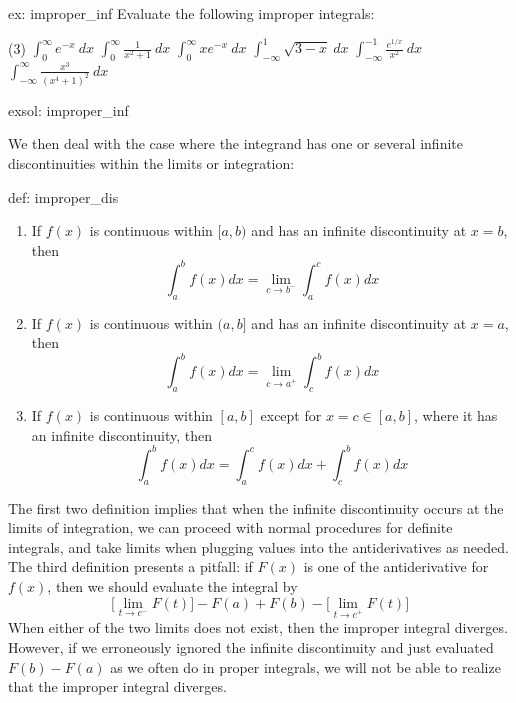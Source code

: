 \begin{ex}[]{ex: improper_inf}
    Evaluate the following improper integrals:
    \begin{tasks}(3)
        \task $\int_0^\infty e^{-x}~dx$
        \task $\int_0^\infty \frac{1}{x^2+1}~dx$
        \task $\int_0^\infty xe^{-x}~dx$
        \task $\int_{-\infty}^1 \sqrt{3-x}~dx$
        \task $\int_{-\infty}^{-1} \frac{e^{1/x}}{x^2}~dx$
        \task $\int_{-\infty}^{\infty} \frac{x^3}{(x^4+1)^2}~dx$
    \end{tasks}
\end{ex}

\begin{exsol}[]{exsol: improper_inf}
    \lipsum[2-4]
    \lipsum[2-4]
    \lipsum[2-3]
\end{exsol}

We then deal with the case where the integrand has one or several infinite discontinuities within the limits or integration:

\begin{defi}{def: improper_dis}
    \begin{enumerate}
        \item If $f(x)$ is continuous within $[a, b)$ and has an infinite discontinuity at $x = b$, then
        \[\int_a^b f(x)dx = \lim_{c \rightarrow b^-} \int_a^c f(x)dx\]
        \item If $f(x)$ is continuous within $(a, b]$ and has an infinite discontinuity at $x = a$, then
        \[\int_a^b f(x)dx = \lim_{c \rightarrow a^+} \int_c^b f(x)dx\]
        \item If $f(x)$ is continuous within $[a, b]$ except for $x = c \in [a, b]$, where it has an infinite discontinuity, then
        \[\int_a^b f(x)dx = \int_a^c f(x)dx + \int_c^b f(x)dx\]
    \end{enumerate}
\end{defi}

The first two definition implies that when the infinite discontinuity occurs at the limits of integration, we can proceed with normal procedures for definite integrals, and take limits when plugging values into the antiderivatives as needed.  The third definition presents a pitfall: if $F(x)$ is one of the antiderivative for $f(x)$, then we should evaluate the integral by
\[\big[\lim_{t \rightarrow c^-} F(t)\big] - F(a) + F(b) - \big[\lim_{t \rightarrow c^+} F(t)\big]\]
When either of the two limits does not exist, then the improper integral diverges.  However, if we erroneously ignored the infinite discontinuity and just evaluated $F(b)-F(a)$ as we often do in proper integrals, we will not be able to realize that the improper integral diverges. 

